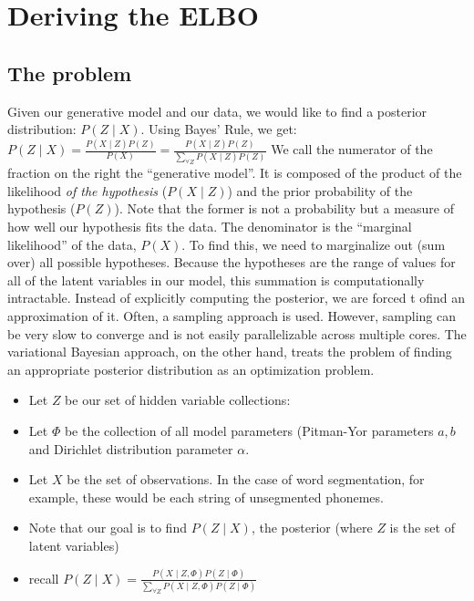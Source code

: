 
\section{Deriving the ELBO}
\label{append_a}
\subsection{The problem}

Given our generative model and our data, we would
like to find a posterior distribution: $P(Z \mid  X)$. Using
Bayes’ Rule, we get:
$P(Z\mid X) = \frac{P(X\mid Z)P(Z)}{P(X)} = \frac{P(X\mid Z)P(Z)}{\sum\limits_{\forall Z} P(X\mid Z) P(Z)}$
We call the numerator of the fraction on the right the “generative
model”. It is composed of the product of the likelihood \textit{of the
hypothesis} ($P(X\mid Z)$) and the prior probability of the hypothesis
($P(Z)$). Note that the former is not a probability but a measure of how
well our hypothesis fits the data. The denominator is the ``marginal
likelihood'' of the data, $P(X)$. To find this, we need to marginalize
out (sum over) all possible hypotheses. Because the hypotheses are the
range of values for all of the latent variables in our model, this
summation is computationally intractable. Instead of explicitly computing the posterior, we are forced t ofind an approximation of it. Often, a sampling approach is used. However, sampling can
be very slow to converge and is not easily parallelizable across
multiple cores. The variational Bayesian approach, on the other hand,
treats the problem of finding an appropriate posterior distribution as an
optimization problem.

 \begin{itemize}
\item   Let $Z$ be our set of hidden variable collections: 
\item   Let $\Phi$ be the collection of all model parameters (Pitman-Yor
    parameters $a,b$ and Dirichlet distribution parameter $\alpha$.
\item   Let $X$ be the set of observations. In the case of word
    segmentation, for example, these would be each string of unsegmented
    phonemes.
\item   Note that our goal is to find $P(Z\mid X)$, the posterior (where $Z$ is
    the set of latent variables)
\item  recall $P(Z\mid X) = \frac{P(X\mid Z, \Phi)P(Z \mid  \Phi)}{\sum\limits_{\forall Z} P(X\mid Z, \Phi) P(Z\mid \Phi) } $ 
\end{itemize}

